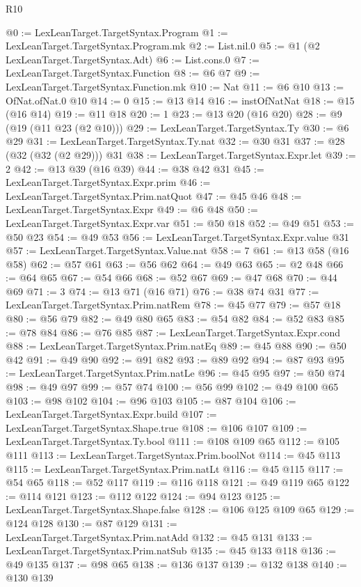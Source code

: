 \begin{lexlean}{R10}
\begin{coremodule}
{{{{{@0 := LexLeanTarget.TargetSyntax.Program
@1 := LexLeanTarget.TargetSyntax.Program.mk
@2 := List.nil.{0}
@5 := @1 (@2 LexLeanTarget.TargetSyntax.Adt)
@6 := List.cons.{0}
@7 := LexLeanTarget.TargetSyntax.Function
@8 := @6 @7
@9 := LexLeanTarget.TargetSyntax.Function.mk
@10 := Nat
@11 := @6 @10
@13 := OfNat.ofNat.{0} @10
@14 := 0
@15 := @13 @14
@16 := instOfNatNat
@18 := @15 (@16 @14)
@19 := @11 @18
@20 := 1
@23 := @13 @20 (@16 @20)
@28 := @9 (@19 (@11 @23 (@2 @10)))
@29 := LexLeanTarget.TargetSyntax.Ty
@30 := @6 @29
@31 := LexLeanTarget.TargetSyntax.Ty.nat
@32 := @30 @31
@37 := @28 (@32 (@32 (@2 @29))) @31
@38 := LexLeanTarget.TargetSyntax.Expr.let
@39 := 2
@42 := @13 @39 (@16 @39)
@44 := @38 @42 @31
@45 := LexLeanTarget.TargetSyntax.Expr.prim
@46 := LexLeanTarget.TargetSyntax.Prim.natQuot
@47 := @45 @46
@48 := LexLeanTarget.TargetSyntax.Expr
@49 := @6 @48
@50 := LexLeanTarget.TargetSyntax.Expr.var
@51 := @50 @18
@52 := @49 @51
@53 := @50 @23
@54 := @49 @53
@56 := LexLeanTarget.TargetSyntax.Expr.value @31
@57 := LexLeanTarget.TargetSyntax.Value.nat
@58 := 7
@61 := @13 @58 (@16 @58)
@62 := @57 @61
@63 := @56 @62
@64 := @49 @63
@65 := @2 @48
@66 := @64 @65
@67 := @54 @66
@68 := @52 @67
@69 := @47 @68
@70 := @44 @69
@71 := 3
@74 := @13 @71 (@16 @71)
@76 := @38 @74 @31
@77 := LexLeanTarget.TargetSyntax.Prim.natRem
@78 := @45 @77
@79 := @57 @18
@80 := @56 @79
@82 := @49 @80 @65
@83 := @54 @82
@84 := @52 @83
@85 := @78 @84
@86 := @76 @85
@87 := LexLeanTarget.TargetSyntax.Expr.cond
@88 := LexLeanTarget.TargetSyntax.Prim.natEq
@89 := @45 @88
@90 := @50 @42
@91 := @49 @90
@92 := @91 @82
@93 := @89 @92
@94 := @87 @93
@95 := LexLeanTarget.TargetSyntax.Prim.natLe
@96 := @45 @95
@97 := @50 @74
@98 := @49 @97
@99 := @57 @74
@100 := @56 @99
@102 := @49 @100 @65
@103 := @98 @102
@104 := @96 @103
@105 := @87 @104
@106 := LexLeanTarget.TargetSyntax.Expr.build
@107 := LexLeanTarget.TargetSyntax.Shape.true
@108 := @106 @107
@109 := LexLeanTarget.TargetSyntax.Ty.bool
@111 := @108 @109 @65
@112 := @105 @111
@113 := LexLeanTarget.TargetSyntax.Prim.boolNot
@114 := @45 @113
@115 := LexLeanTarget.TargetSyntax.Prim.natLt
@116 := @45 @115
@117 := @54 @65
@118 := @52 @117
@119 := @116 @118
@121 := @49 @119 @65
@122 := @114 @121
@123 := @112 @122
@124 := @94 @123
@125 := LexLeanTarget.TargetSyntax.Shape.false
@128 := @106 @125 @109 @65
@129 := @124 @128
@130 := @87 @129
@131 := LexLeanTarget.TargetSyntax.Prim.natAdd
@132 := @45 @131
@133 := LexLeanTarget.TargetSyntax.Prim.natSub
@135 := @45 @133 @118
@136 := @49 @135
@137 := @98 @65
@138 := @136 @137
@139 := @132 @138
@140 := @130 @139
}}}}}
\end{coremodule}
\end{lexlean}
